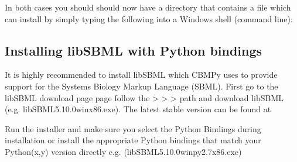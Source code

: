 \documentclass[letterpaper,10pt,english]{sphinxmanual}
\begin{document}
\sphinxAtStartPar
In both cases you should should now have a directory that contains a file
 which can install by simply typing the following into a Windows shell
(command line):

\begin{sphinxVerbatim}[commandchars=\\\{\}]
  
  
\end{sphinxVerbatim}


\subsection{Installing libSBML with Python bindings}
\label{\detokenize{install_doc:installing-libsbml-with-python-bindings}}
\sphinxAtStartPar
It is highly recommended to install libSBML which CBMPy uses to provide support
for the Systems Biology Markup Language (SBML). First go to the libSBML download
page  page follow the  \textendash{}\textgreater{}  \textendash{}\textgreater{}
 \textendash{}\textgreater{}  path and download libSBML (e.g. libSBML\sphinxhyphen{}5.10.0\sphinxhyphen{}win\sphinxhyphen{}x86.exe). The latest
stable version can be found at 
\begin{quote}

\sphinxAtStartPar
{}
\end{quote}

\sphinxAtStartPar
Run the installer and make sure you select the Python Bindings during installation
or install the appropriate Python bindings that match your Python(x,y) version directly e.g.
(libSBML\sphinxhyphen{}5.10.0\sphinxhyphen{}win\sphinxhyphen{}py2.7\sphinxhyphen{}x86.exe)
\end{document}
